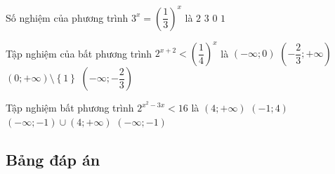 \begin{ex}%
	Số nghiệm của phương trình $3^x={\left( \dfrac{1}{3} \right)}^x$ là
	\choice
	{ $2$}
	{ $3$}
	{ $0$}
	{\True  $1$}
\end{ex}

\begin{ex}%
	Tập nghiệm của bất phương trình $2^{x+2}<\left( \dfrac{1}{4} \right)^x$ là
	\choice
	{ $\left( -\infty ;0 \right)$}
	{ $\left( -\dfrac{2}{3};+\infty  \right)$}
	{ $\left( 0;+\infty  \right)\setminus \left\{ 1 \right\}$}
	{\True  $\left( -\infty ;-\dfrac{2}{3} \right)$}
\end{ex}


\begin{ex}%
	Tập nghiệm bất phương trình $2^{x^2-3x}<16$ là
	\choice
	{ $\left( 4;+\infty  \right)$}
	{\True  $\left( -1;4 \right)$}
	{ $\left( -\infty ;-1 \right)\cup \left( 4;+\infty  \right)$}
	{ $\left( -\infty ;-1 \right)$}
\end{ex}
\subsection{Bảng đáp án}
